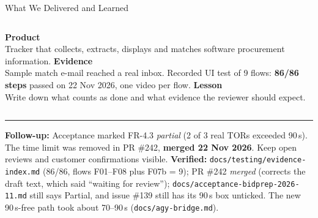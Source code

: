 \documentclass[aspectratio=169,10pt]{beamer}
\newcommand{\verified}[1]{\vfill{\footnotesize\color{ok}\textbf{Verified:} #1}}
\begin{document}
\begin{frame}{What We Delivered and Learned}
  \begin{columns}[T]
    \textbf{Product}\\ Tracker that collects, extracts, displays and matches software procurement information.
    \textbf{Evidence}\\ Sample match e-mail reached a real inbox. Recorded UI test of 9 flows: \textbf{86/86 steps} passed on 22 Nov 2026, one video per flow.
    \textbf{Lesson}\\ Write down what counts as done and what evidence the reviewer should expect.
  \end{columns}
  \medskip\hrule\smallskip
  {\footnotesize \textbf{Follow-up:} Acceptance marked FR-4.3 \emph{partial} (2 of 3 real TORs exceeded 90\,s). The time limit was removed in PR \#242, \textbf{merged 22 Nov 2026}. Keep open reviews and customer confirmations visible.}
  \verified{\texttt{docs/testing/evidence-index.md} (86/86, flows F01--F08 plus F07b = 9); PR \#242 \emph{merged} (corrects the draft text, which said ``waiting for review''); \texttt{docs/acceptance-bidprep-2026-11.md} still says Partial, and issue \#139 still has its 90\,s box unticked. The new 90\,s-free path took about 70--90\,s (\texttt{docs/agy-bridge.md}).}
\end{frame}
\end{document}

